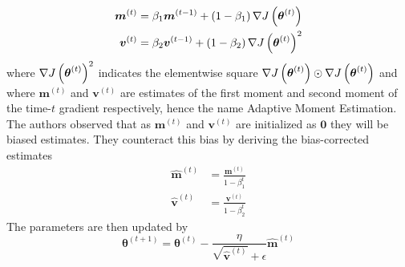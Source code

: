 \begin{equation*}
    \begin{split}
        \boldsymbol{m}^{(t)} &= \beta_1 \boldsymbol{m}^{(t-1)} + \left (1- \beta_1\right)\nabla J \left (\boldsymbol{\theta}^{(t)}\right)\\
        \boldsymbol{v}^{(t)} &= \beta_2 \boldsymbol{v}^{(t-1)} + \left (1 - \beta_2\right)\nabla J \left (\boldsymbol{\theta}^{(t)}\right)^2
    \end{split}
\end{equation*}
where $\nabla J \left (\boldsymbol{\theta}^{(t)}\right)^2$ indicates the elementwise square $\nabla J \left (\boldsymbol{\theta}^{(t)}\right) \odot \nabla J \left (\boldsymbol{\theta}^{(t)}\right)$ and where $\boldsymbol{m}^{(t)}$ and $\boldsymbol{v}^{(t)}$ are estimates of the first moment and second moment of the time-$t$ gradient respectively, hence the name Adaptive Moment Estimation. 
The authors observed that as $\boldsymbol{m}^{(t)}$ and $\boldsymbol{v}^{(t)}$ are initialized as $\boldsymbol{0}$ they will be biased estimates. They counteract this bias by deriving the bias-corrected estimates
\begin{equation*}
    \begin{split}
        \hat{\boldsymbol{m}}^{(t)} &= \frac{\boldsymbol{m}^{(t)}}{1 - \beta_1^t}\\
        \hat{\boldsymbol{v}}^{(t)} &= \frac{\boldsymbol{v}^{(t)}}{1 - \beta_2^t}
    \end{split}
\end{equation*}
The parameters are then updated by 
\begin{equation*}
    \boldsymbol{\theta}^{(t+1)} = \boldsymbol{\theta}^{(t)} - \frac{\eta}{\sqrt{\hat{\boldsymbol{v}}^{(t)}} + \epsilon}\hat{\boldsymbol{m}}^{(t)}
\end{equation*}
